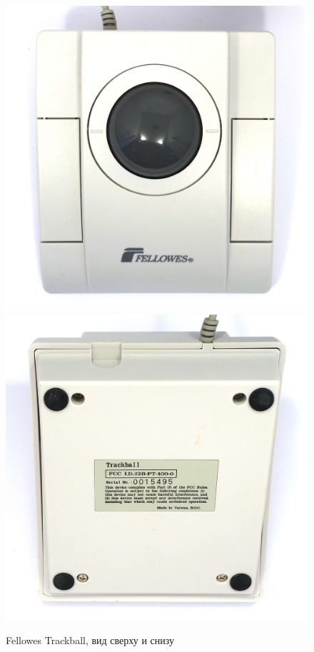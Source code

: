 \documentclass[11pt, a4paper]{article}
\begin{document}
\begin{figure}[h]
    \centering
    \includegraphics[scale=0.45]{1995_fellowes_trackball/top_60.jpg}
    \includegraphics[scale=0.45]{1995_fellowes_trackball/bottom_60.jpg}
    \caption{Fellowes Trackball, вид сверху и снизу}
    \label{fig:FellowesTrackballTopBottom}
\end{figure}
\end{document}
